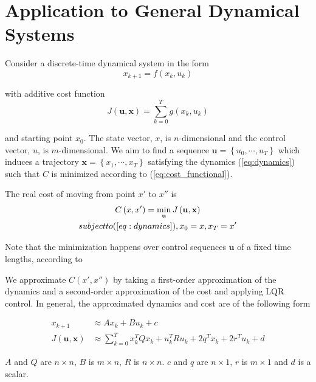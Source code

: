 \documentclass[letterpaper, 10pt, english, conference]{IEEEtran}
\begin{document}
\section{Application to General Dynamical Systems}

Consider a discrete-time dynamical system in the form 
\begin{equation}
x_{k+1}=f\left(x_{k},u_{k}\right)\label{eq:dynamics}
\end{equation}


with additive cost function
\begin{equation}
J\left(\mathbf{u},\mathbf{x}\right)=\sum_{k=0}^{T}g\left(x_{k},u_{k}\right)\label{eq:cost_functional}
\end{equation}


and starting point $x_{0}$. The state vector, $x$, is $n$-dimensional
and the control vector, $u$, is $m$-dimensional. We aim to find
a sequence $ $$\mathbf{u}=\left\{ u_{0},\cdots,u_{T}\right\} $ which
induces a trajectory $\mathbf{x}=\left\{ x_{1},\cdots,x_{T}\right\} $
satisfying the dynamics (\ref{eq:dynamics}) such that $ $$C$ is
minimized according to (\ref{eq:cost_functional}).

The real cost of moving from point $x'$ to $x''$ is
\begin{multline*}
C\left(x,x'\right)=\min_{\mathbf{u}}J\left(\mathbf{u},\mathbf{x}\right)\\
\mbox{subject to (\ensuremath{\ref{eq:dynamics}}), \ensuremath{x_{0}=x}, \ensuremath{x_{T}=x'}}
\end{multline*}


Note that the minimization happens over control sequences $\mathbf{u}$
of a fixed time lengths, according to 

We approximate $C\left(x',x''\right)$ by taking a first-order approximation
of the dynamics and a second-order approximation of the cost and applying
LQR control. In general, the approximated dynamics and cost are of
the following form

\begin{align}
x_{k+1} & \approx Ax_{k}+Bu_{k}+c\label{eq:dynamics_approx}\\
J\left(\mathbf{u},\mathbf{x}\right) & \approx\sum_{k=0}^{T}x_{k}^{T}Qx_{k}+u_{k}^{T}Ru_{k}+2q^{T}x_{k}+2r^{T}u_{k}+d\label{eq:cost_approx}
\end{align}


$A$ and $Q$ are $n\times n$, $B$ is $m\times n$, $R$ is $n\times n$.
$c$ and $q$ are $n\times1$, $r$ is $m\times1$ and $d$ is a scalar.
\end{document}
